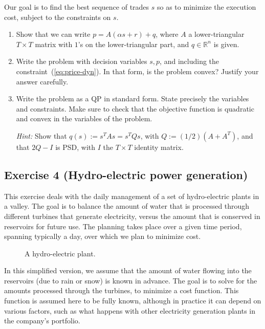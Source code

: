 \documentclass[11pt]{article}
\begin{document}
Our goal is to find the best sequence of trades $s$ so as to minimize the execution cost, subject to the constraints on $s$.
\begin{enumerate}
\item Show that we can write $p = A(\alpha s+r)+q$, where $A$ a lower-triangular $T \times T$ matrix with $1$'s on the lower-triangular part, and $q\in \mathbb{R}^{n}$ is given.

\item Write the problem with decision variables $s,p$, and including the constraint~(\ref{eq:price-dyn}). In that form, is the problem convex? Justify your answer carefully.

\item Write the problem as a QP in standard form. State precisely the variables and constraints.  Make sure to check that the objective function is quadratic and convex in the variables of the problem.

{\em Hint:} Show that $q(s) := s^T As = s^TQs$, with $Q := (1/2) (A+A^T)$, and that $2Q-I$ is PSD, with $I$ the $T \times T$ identity matrix.
\end{enumerate}

\begin{solution}
\end{solution}

\newpage
\subsection*{Exercise 4 (Hydro-electric power generation)}

This exercise deals with the daily management of a set of hydro-electric plants in a valley. The goal is to balance the amount of water that is processed through different turbines that generate electricity, versus the amount that is conserved in reservoirs for future use. The planning takes place over a given time period, spanning typically a day, over which we plan to minimize cost.

\begin{figure}[h!]
\begin{center}
\caption{A hydro-electric plant.}
\end{center}
\end{figure}

In this simplified version, we assume that the amount of water flowing into the reservoirs (due to rain or snow) is known in advance. The goal is to solve for the amounts processed through the turbines, to minimize a cost function. This function is assumed here to be fully known, although in practice it can depend on various factors, such as what happens with other electricity generation plants in the company's portfolio.
\end{document}
